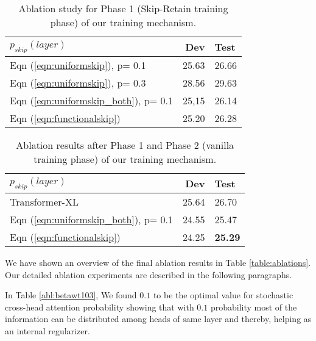 \documentclass[11pt]{article}
\begin{document}
\begin{table}[!htb]

\centering
\begin{tabular}{lrl}
\hline \textbf{$p_{skip}(layer)$} & \textbf{Dev} & \textbf{Test} \\ \hline
Eqn (\ref{eqn:uniformskip}), p= 0.1 & 25.63 & 26.66  \\
Eqn (\ref{eqn:uniformskip}), p= 0.3 & 28.56 & 29.63  \\
Eqn (\ref{eqn:uniformskip_both}), p= 0.1 & 25,15 & 26.14  \\
Eqn (\ref{eqn:functionalskip}) &  25.20 & 26.28  \\

\hline
\end{tabular}
\caption{ Ablation study for Phase 1 (Skip-Retain training phase) of our training mechanism.}
\label{table:sdwt103}
\end{table}
      



\begin{table}[!htb]
\centering

\begin{tabular}{lrl}
\hline \textbf{$p_{skip}(layer)$} & \textbf{Dev} & \textbf{Test} \\ \hline
Transformer-XL &  25.64 & 26.70 \\
\hline
Eqn (\ref{eqn:uniformskip_both}), p= 0.1 & 24.55 & 25.47  \\
Eqn (\ref{eqn:functionalskip}) &  24.25 & \textbf{25.29}  \\

\hline
\end{tabular}
\caption{ Ablation results after Phase 1 and Phase 2 (vanilla training phase) of our training mechanism.}
\label{table:sdfinewt103}

\end{table}





We have shown an overview of the final ablation results in Table \ref{table:ablations}. Our detailed ablation experiments are described in the following paragraphs.



In Table \ref{abl:betawt103}, We found $0.1$ to be the optimal value for stochastic cross-head attention probability showing that with $0.1$ probability most of the information can be distributed among heads of same layer and thereby, helping as an internal regularizer. 
\end{document}
